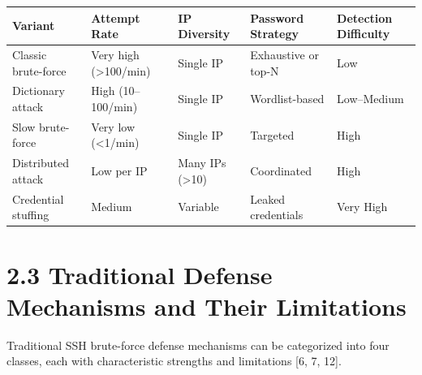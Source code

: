 \documentclass[
  a4paper]{report}
\newcounter{none} %
\begin{document}
{\def\LTcaptype{none} %
\begin{longtable}[]{@{}
  >{\raggedright\arraybackslash}p{}
  >{\raggedright\arraybackslash}p{}
  >{\raggedright\arraybackslash}p{}
  >{\raggedright\arraybackslash}p{}
  >{\raggedright\arraybackslash}p{}@{}}
\toprule\noalign{}
\begin{minipage}[b]{\linewidth}\raggedright
Variant
\end{minipage} & \begin{minipage}[b]{\linewidth}\raggedright
Attempt Rate
\end{minipage} & \begin{minipage}[b]{\linewidth}\raggedright
IP Diversity
\end{minipage} & \begin{minipage}[b]{\linewidth}\raggedright
Password Strategy
\end{minipage} & \begin{minipage}[b]{\linewidth}\raggedright
Detection Difficulty
\end{minipage} \\
\midrule\noalign{}
\endhead
\bottomrule\noalign{}
\endlastfoot
Classic brute-force & Very high (\textgreater100/min) & Single IP &
Exhaustive or top-N & Low \\
Dictionary attack & High (10--100/min) & Single IP & Wordlist-based &
Low--Medium \\
Slow brute-force & Very low (\textless1/min) & Single IP & Targeted &
High \\
Distributed attack & Low per IP & Many IPs (\textgreater10) &
Coordinated & High \\
Credential stuffing & Medium & Variable & Leaked credentials & Very
High \\
\end{longtable}
}

\section{2.3 Traditional Defense Mechanisms and Their
Limitations}\label{traditional-defense-mechanisms-and-their-limitations}

Traditional SSH brute-force defense mechanisms can be categorized into
four classes, each with characteristic strengths and limitations {[}6,
7, 12{]}.
\end{document}
